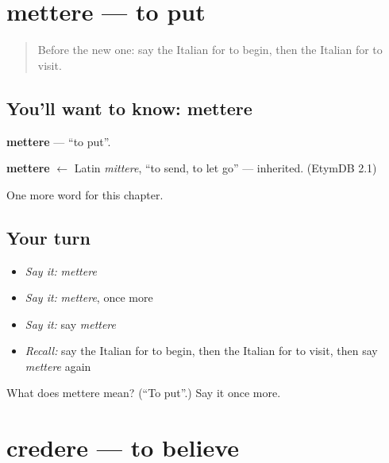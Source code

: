 \section[mettere]{mettere — to put}

\label{lesson:IT-C133-mettere}



\begin{quote}
Before the new one: say the Italian for to begin, then the Italian for to visit.
\end{quote}

\subsection*{You'll want to know: mettere}
\textbf{mettere} — \textquotedblleft{}to put\textquotedblright{}.

\begin{cousinweb}
\textbf{mettere} $\leftarrow$ Latin \emph{mittere}, \textquotedblleft{}to send, to let go\textquotedblright{} — inherited. (EtymDB 2.1)
\end{cousinweb}

\begin{grammarlens}[title={What you've built}]
One more word for this chapter.
\end{grammarlens}

\subsection*{Your turn}
\begin{itemize}
\raggedright
  \item \emph{Say it:} \emph{mettere}
  \item \emph{Say it:} \emph{mettere}, once more
  \item \emph{Say it:} say \emph{mettere}
  \item \emph{Recall:} say the Italian for to begin, then the Italian for to visit, then say \emph{mettere} again
\end{itemize}

\begin{tcolorbox}[breakable,colback=teal!4,colframe=teal!35!black,title={Before you move on}]
What does mettere mean? (\textquotedblleft{}To put\textquotedblright{}.) Say it once more.
\end{tcolorbox}
\section[credere]{credere — to believe}

